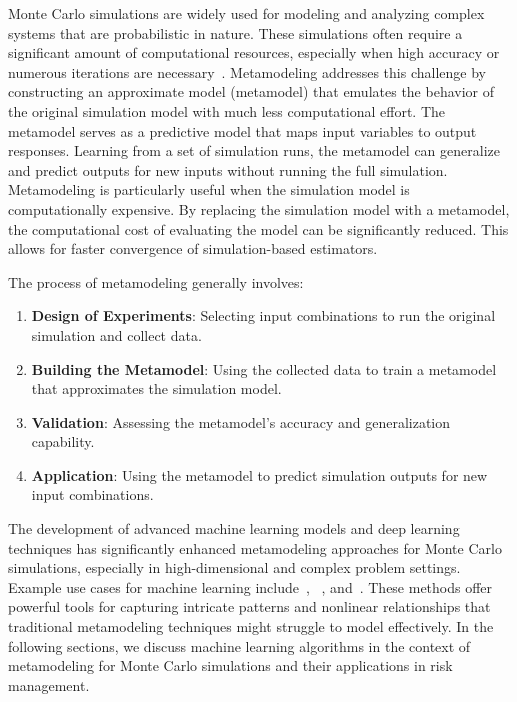 Monte Carlo simulations are widely used for modeling and analyzing complex systems that are probabilistic in nature. 
These simulations often require a significant amount of computational resources, especially when high accuracy or numerous iterations are necessary~\citep{glasserman2004monte}. 
Metamodeling addresses this challenge by constructing an approximate model (metamodel) that emulates the behavior of the original simulation model with much less computational effort.
The metamodel serves as a predictive model that maps input variables to output responses. 
Learning from a set of simulation runs, the metamodel can generalize and predict outputs for new inputs without running the full simulation.
Metamodeling is particularly useful when the simulation model is computationally expensive. 
By replacing the simulation model with a metamodel, the computational cost of evaluating the model can be significantly reduced. 
This allows for faster convergence of simulation-based estimators.

The process of metamodeling generally involves:

\begin{enumerate} 
    \item \textbf{Design of Experiments}: Selecting input combinations to run the original simulation and collect data. 
    \item \textbf{Building the Metamodel}: Using the collected data to train a metamodel that approximates the simulation model. 
    \item \textbf{Validation}: Assessing the metamodel's accuracy and generalization capability.
    \item \textbf{Application}: Using the metamodel to predict simulation outputs for new input combinations.
\end{enumerate}

The development of advanced machine learning models and deep learning techniques has significantly enhanced metamodeling approaches for Monte Carlo simulations, especially in high-dimensional and complex problem settings.
Example use cases for machine learning include~\cite{jin2020deep}, ~\cite{tang2020deep}, and~\cite{rosen2012metamodeling}.
These methods offer powerful tools for capturing intricate patterns and nonlinear relationships that traditional metamodeling techniques might struggle to model effectively.
In the following sections, we discuss machine learning algorithms in the context of metamodeling for Monte Carlo simulations and their applications in risk management.

